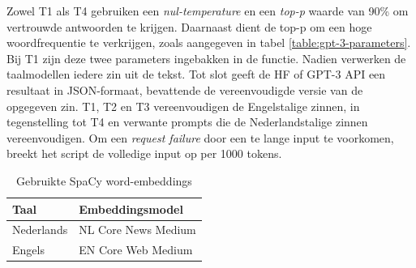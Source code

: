 Zowel T1 als T4 gebruiken een \textit{nul-temperature} en een \textit{top-p} waarde van 90\% om vertrouwde antwoorden te krijgen. Daarnaast dient de top-p om een hoge woordfrequentie te verkrijgen, zoals aangegeven in tabel \ref{table:gpt-3-parameters}. Bij T1 zijn deze twee parameters ingebakken in de functie. Nadien verwerken de taalmodellen iedere zin uit de tekst. Tot slot geeft de HF of GPT-3 API een resultaat in JSON-formaat, bevattende de vereenvoudigde versie van de opgegeven zin. T1, T2 en T3 vereenvoudigen de Engelstalige zinnen, in tegenstelling tot T4 en verwante prompts die de Nederlandstalige zinnen vereenvoudigen. Om een \textit{request failure} door een te lange input te voorkomen, breekt het script de volledige input op per 1000 tokens.

\begin{center}
	\begin{table}[H]
		\begin{tabular}{ | m{7cm} | m{7cm} | } 
			\hline
			\textbf{Taal} & \textbf{Embeddingsmodel} \\
			\hline
			Nederlands & NL Core News Medium \\ 
			\hline
			Engels & EN Core Web Medium \\
			\hline
		\end{tabular}
		\caption{Gebruikte SpaCy word-embeddings}
		\label{table:wordembeddings-spacy}
	\end{table}
\end{center}

